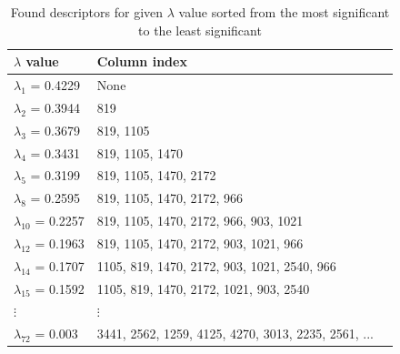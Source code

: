 \documentclass[11pt,oneside,czech,american]{book} %
\theoremstyle{definition} %
\theoremstyle{definition}
\begin{document}
\begin{table}[H]
	\centering
	\begin{tabular}{lll} 
		\hline
		$\lambda$ value & Column index                                                                \\ 
		\hline
		$\lambda_1$ = 0.4229    & None                                                               \\ 
		
		$\lambda_2$ = 0.3944    & 819                                                         \\ 
		
		$\lambda_3$ = 0.3679    & 819, 1105                                                  \\ 
		
		$\lambda_4$ = 0.3431    & 819, 1105, 1470                                             \\ 
		
		$\lambda_5$ = 0.3199    & 819, 1105, 1470, 2172                                        \\ 
		
		$\lambda_8$  = 0.2595    & 819, 1105, 1470, 2172, 966                                  \\ 
		
		$\lambda_{10}$ = 0.2257    & 819, 1105, 1470, 2172, 966, 903, 1021                             \\ 
		
		$\lambda_{12}$ = 0.1963    & 819, 1105, 1470, 2172, 903, 1021, 966                       \\ 
		
		$\lambda_{14}$ = 0.1707    & 1105, 819, 1470, 2172, 903, 1021, 2540, 966                \\ 
		
		$\lambda_{15}$  = 0.1592    & 1105, 819, 1470, 2172, 1021, 903, 2540        \\ 
		
		$\vdots$  & $\vdots$                                                   \\ 
		
		$\lambda_{72}$ = 0.003     & 3441, 2562, 1259, 4125, 4270, 3013, 2235, 2561, ...         \\
		\hline
	\end{tabular}
	\caption{Found descriptors for given $\lambda$ value sorted from the most significant to the least significant}
	\label{instability}
\end{table}
\end{document}
